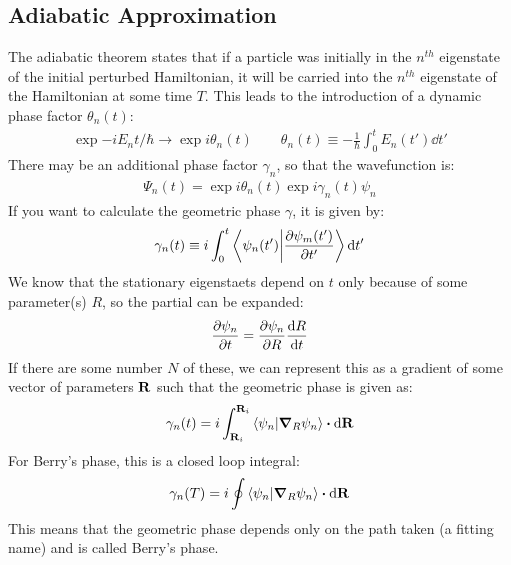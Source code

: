 \subsection{Adiabatic Approximation}
The adiabatic theorem states that if a particle was initially in the $n^{th}$ eigenstate of the initial perturbed Hamiltonian, it will be carried into the $n^{th}$ eigenstate of the Hamiltonian at some time $T$. This leads to the introduction of a dynamic phase factor $\theta_n(t)$:
\begin{align*}
  \exp{-iE_nt/\hbar}\to\exp{i\theta_n(t)}\qquad\theta_n(t)\equiv-\frac{1}{\hbar}
  \int_0^tE_n(t')\dd{t'}
\end{align*}
There may be an additional phase factor $\gamma_n$, so that the wavefunction is:
\begin{align*}
  \Psi_n(t)=\exp{i\theta_n(t)}\exp{i\gamma_n(t)}\psi_n
\end{align*}
If you want to calculate the geometric phase $\gamma$, it is given by:
\begin{align*}
  \gamma_n(t)\equiv i\int_0^t\ip{\psi_n(t')}{\pdv{\psi_m(t')}{t'}}\dd{t'}
\end{align*}
We know that the stationary eigenstaets depend on $t$ only because of some parameter(s) $R$, so the partial can be expanded:
\begin{align*}
  \pdv{\psi_n}{t}=\pdv{\psi_n}{R}\dv{R}{t}
\end{align*}
If there are some number $N$ of these, we can represent this as a gradient of some vector of parameters $\vb{R}$ such that the geometric phase is given as:
\begin{align*}
  \gamma_n(t)=i\int_{\vb{R}_i}^{\vb{R}_i}\ip{\psi_n}{\grad_R\psi_n}\vdot\dd{\vb{R}}
\end{align*}
For Berry's phase, this is a closed loop integral:
\begin{align*}
  \gamma_n(T)=i\oint\ip{\psi_n}{\grad_R\psi_n}\vdot\dd{\vb{R}}
\end{align*}
This means that the geometric phase depends only on the path taken (a fitting name) and is called Berry's phase.